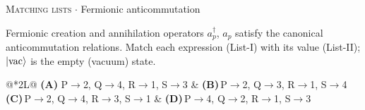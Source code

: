 \documentclass[11pt,a4paper]{article}
\newcommand{\optlabel}[1]{\textbf{(#1)}}
\newcommand{\correctlabel}[1]{\textcolor{okgreen}{\textbf{(#1)}\,\ding{51}}}
\newenvironment{qitem}[1]{\begin{list}{}{\setlength{\leftmargin}{3.3em}\setlength{\labelwidth}{3.1em}%
  \setlength{\labelsep}{0.2em}\setlength{\topsep}{3pt}\setlength{\parsep}{3pt}}\item[\textbf{Q.#1}\hfill]}{\end{list}}
\newcommand{\qmeta}[2]{{\footnotesize\color{black!60}\textsc{#1} \;$\cdot$\; #2}\par}
\begin{document}
\begin{qitem}{11}
\qmeta{Matching lists}{Fermionic anticommutation}
Fermionic creation and annihilation operators $a_p^\dagger$, $a_p$ satisfy the canonical anticommutation relations. Match each expression
(List-I) with its value (List-II); $\ket{\mathrm{vac}}$ is the empty (vacuum) state.
\par\smallskip{}
\par\smallskip\noindent\begin{tabularx}{\linewidth}{@{}*{2}{L}@{}}
\correctlabel{A}\,P$\to$2, Q$\to$4, R$\to$1, S$\to$3 & \optlabel{B}\,P$\to$2, Q$\to$3, R$\to$1, S$\to$4 \\[3pt]
\optlabel{C}\,P$\to$2, Q$\to$4, R$\to$3, S$\to$1 & \optlabel{D}\,P$\to$4, Q$\to$2, R$\to$1, S$\to$3
\end{tabularx}
\end{qitem}
\end{document}
